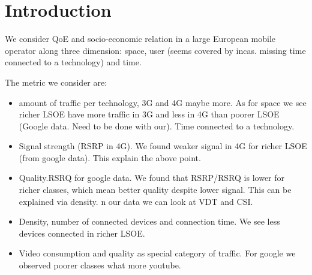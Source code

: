 \section{Introduction}

We consider QoE and socio-economic relation in a large European mobile operator along three dimension: space, user (seems covered by incas. missing time connected to a technology) and time.

The metric we consider are:
\begin{itemize}
\item amount of traffic per technology, \ie 3G and 4G maybe more.  As for space we see richer LSOE have more traffic in 3G and less in 4G than poorer LSOE (Google data. Need to be done with our).  Time connected to a technology. 
\item Signal strength (RSRP in 4G).
We found weaker signal in 4G for richer LSOE (from google data). This explain the above point. 
\item Quality.RSRQ for google data. 
We  found that RSRP/RSRQ is lower for richer classes, which mean better quality despite lower signal. This can be explained via density.
n our data we can look at VDT and CSI. 
\item Density, \ie number of connected devices and connection time. We see less devices connected in richer LSOE.
\item Video consumption and quality as special category of traffic. For google we observed poorer classes what more youtube.
\end{itemize}